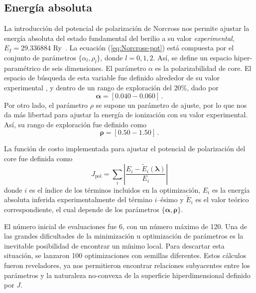 \subsection{Energía absoluta}

La introducción del potencial de polarización de Norcross nos permite
ajustar la energía absoluta del estado fundamental del berilio a su valor 
\textit{experimental}, $E_I=29.336884$ Ry~\cite{NIST}. La ecuación 
(\ref{eq:Norcross-pot}) está compuesta por el conjunto de parámetros 
$\{\alpha_l,\rho_l\}$, donde $l=0,1,2$. Así, se define un espacio 
hiper-paramétrico de seis dimensiones. El parámetro $\alpha$ es la 
polarizabilidad de core. El espacio de búsqueda de esta variable fue 
definido alrededor de su valor experimental \cite{Dalgarno:62,Sitz:71},
y dentro de un rango de exploración del 20\%, dado por
\begin{equation}
\boldsymbol\alpha=[0.040-0.060]\,.
\end{equation}
Por otro lado, el parámetro $\rho$ se supone un parámetro de ajuste, por 
lo que nos da más libertad para ajustar la energía de ionización con su 
valor experimental. Así, su rango de exploración fue definido como
\begin{equation}
\boldsymbol\rho=[0.50-1.50]\,.
\end{equation}

La función de costo implementada para ajustar el potencial de 
polarización del core fue definida como
\begin{equation}
J_{\mathrm{pol}} = \sum_{i} \left|\frac{E_{i}-\tilde{E}_{i}
(\boldsymbol{\lambda})}{E_{i}} \right|
\label{eq:Jpol}
\end{equation}
donde $i$ es el índice de los términos incluidos en la optimización, 
$E_{i}$ es la energía absoluta inferida experimentalmente del 
término $i$--ésimo y $\tilde{E}_{i}$ es el valor teórico correspondiente, 
el cual depende de los parámetros $\{\boldsymbol\alpha,\boldsymbol\rho\}$.

El número inicial de evaluaciones fue 6, con un número máximo de 120. Una 
de las grandes dificultades de la minimización u optimización de 
parámetros es la inevitable posibilidad de encontrar un mínimo local. 
Para descartar esta situación, se lanzaron 100 optimizaciones con 
semillas diferentes. Estos cálculos fueron reveladores, ya nos 
permitieron encontrar relaciones subyacentes entre los parámetros y la
naturaleza no-convexa de la superficie hiperdimensional definido por $J$.

